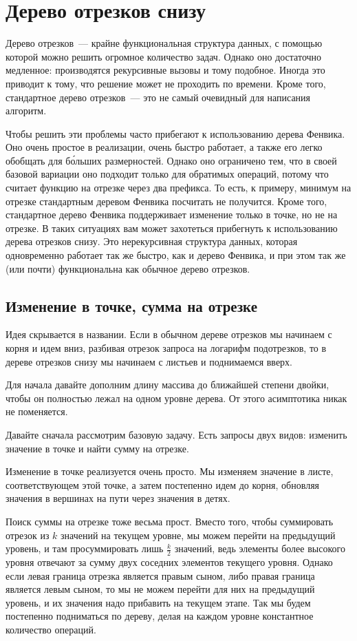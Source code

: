 \chapter{Дерево отрезков снизу} \label{down-segtree}

Дерево отрезков~--- крайне функциональная структура данных, с помощью которой можно решить огромное количество задач. Однако оно достаточно медленное: производятся рекурсивные вызовы и тому подобное. Иногда это приводит к тому, что решение может не проходить по времени. Кроме того, стандартное дерево отрезков~--- это не самый очевидный для написания алгоритм.

Чтобы решить эти проблемы часто прибегают к использованию дерева Фенвика. Оно очень простое в реализации, очень быстро работает, а также его легко обобщать для б\'{о}льших размерностей. Однако оно ограничено тем, что в своей базовой вариации оно подходит только для обратимых операций, потому что считает функцию на отрезке через два префикса. То есть, к примеру, минимум на отрезке стандартным деревом Фенвика посчитать не получится. Кроме того, стандартное дерево Фенвика поддерживает изменение только в точке, но не на отрезке. В таких ситуациях вам может захотеться прибегнуть к использованию дерева отрезков снизу. Это нерекурсивная структура данных, которая одновременно работает так же быстро, как и дерево Фенвика, и при этом так же (или почти) функциональна как обычное дерево отрезков.

\section{Изменение в точке, сумма на отрезке}

Идея скрывается в названии. Если в обычном дереве отрезков мы начинаем с корня и идем вниз, разбивая отрезок запроса на логарифм подотрезков, то в дереве отрезков снизу мы начинаем с листьев и поднимаемся вверх.

Для начала давайте дополним длину массива до ближайшей степени двойки, чтобы он полностью лежал на одном уровне дерева. От этого асимптотика никак не поменяется.

Давайте сначала рассмотрим базовую задачу. Есть запросы двух видов: изменить значение в точке и найти сумму на отрезке.

Изменение в точке реализуется очень просто. Мы изменяем значение в листе, соответствующем этой точке, а затем постепенно идем до корня, обновляя значения в вершинах на пути через значения в детях.

Поиск суммы на отрезке тоже весьма прост. Вместо того, чтобы суммировать отрезок из $k$ значений на текущем уровне, мы можем перейти на предыдущий уровень, и там просуммировать лишь $\frac{k}{2}$ значений, ведь элементы более высокого уровня отвечают за сумму двух соседних элементов текущего уровня. Однако если левая граница отрезка является правым сыном, либо правая граница является левым сыном, то мы не можем перейти для них на предыдущий уровень, и их значения надо прибавить на текущем этапе. Так мы будем постепенно подниматься по дереву, делая на каждом уровне константное количество операций.

